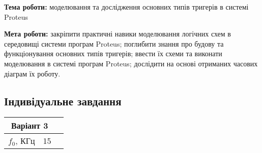 \documentclass[12pt]{extarticle}
\begin{document}
\textbf{Тема роботи:} моделювання та дослідження основних типів тригерів в 
системі Proteus

\vspace{12pt}

\textbf{Мета роботи:} закріпити практичні навики моделювання логічних схем в
середовищі системи програм Proteus; поглибити знання про
будову та функціонування основних типів тригерів; ввести їх
схеми та виконати моделювання в системі програм Proteus;
дослідити на основі отриманих часових діаграм їх роботу.

\subsection*{Індивідуальне завдання}
\begin{center}
    \begin{tabular}{| c | c | c |}
        \hline
        \multicolumn{2}{|c|}{Варіант 3}\\
        \hline
        $f_0$, КГц & 15\\
        \hline
   
    \end{tabular}
\end{center}
\end{document}
